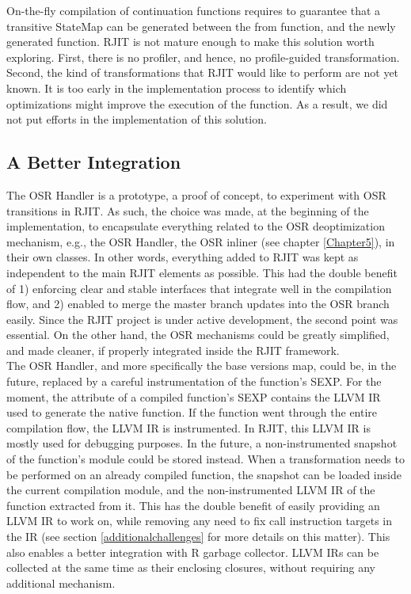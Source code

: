 On-the-fly compilation of continuation functions requires to guarantee that a transitive StateMap can be generated between the from function, and the newly generated function.
RJIT is not mature enough to make this solution worth exploring.
First, there is no profiler, and hence, no profile-guided transformation. 
Second, the kind of transformations that RJIT would like to perform are not yet known. 
It is too early in the implementation process to identify which optimizations might improve the execution of the function.
As a result, we did not put efforts in the implementation of this solution.\\

\subsection{A Better Integration}\label{section:cleanerIR}

The OSR Handler is a prototype, a proof of concept, to experiment with OSR transitions in RJIT. 
As such, the choice was made, at the beginning of the implementation, to encapsulate everything related to the OSR deoptimization mechanism, e.g., the OSR Handler, the OSR inliner (see chapter \ref{Chapter5}), in their own classes.
In other words, everything added to RJIT was kept as independent to the main RJIT elements as possible.
This had the double benefit of 1) enforcing clear and stable interfaces that integrate well in the compilation flow, and 2) enabled to merge the master branch updates into the OSR branch easily.
Since the RJIT project is under active development, the second point was essential.
On the other hand, the OSR mechanisms could be greatly simplified, and made cleaner, if properly integrated inside the RJIT framework.\\

The OSR Handler, and more specifically the base versions map, could be, in the future, replaced by a careful instrumentation of the function's SEXP. 
For the moment, the  attribute of a compiled function's SEXP contains the LLVM IR used to generate the native function.
If the function went through the entire compilation flow, the LLVM IR is instrumented. 
In RJIT, this  LLVM IR is mostly used for debugging purposes.
In the future, a non-instrumented snapshot of the function's module could be stored instead.
When a transformation needs to be performed on an already compiled function, the snapshot can be loaded inside the current compilation module, and the non-instrumented LLVM IR of the function extracted from it.
This has the double benefit of easily providing an LLVM IR to work on, while removing any need to fix call instruction targets in the IR (see section \ref{additionalchallenges} for more details on this matter).
This also enables a better integration with R garbage collector. 
LLVM IRs can be collected at the same time as their enclosing closures, without requiring any additional mechanism.\\

